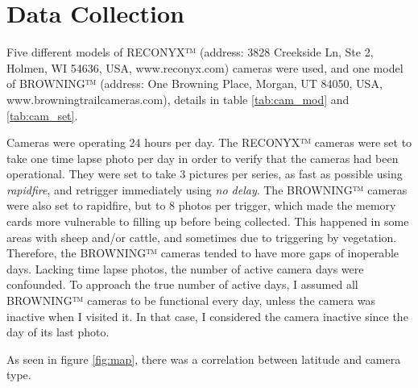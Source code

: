 



\section{Data Collection} 


Five different models of RECONYX™ (address: 3828 Creekside Ln, Ste 2, Holmen, WI 54636, USA, www.reconyx.com) cameras were used, 
and one model of BROWNING™ (address: One Browning Place, Morgan, UT 84050, USA, www.browningtrailcameras.com), details in table \ref{tab:cam_mod} and \ref{tab:cam_set}.






Cameras were operating 24 hours per day. The RECONYX™ cameras were set to take one time lapse photo per day in order to verify that the cameras had been operational.
They were set to take 3 pictures per series, as fast as possible using \emph{rapidfire}, and retrigger immediately using \emph{no delay}.
The BROWNING™ cameras were also set to rapidfire, but to 8 photos per trigger, which made the memory cards more vulnerable to filling up before being collected. This happened in some areas with sheep and/or cattle, and sometimes due to triggering by vegetation.
Therefore, the BROWNING™ cameras tended to have more gaps of inoperable days.
Lacking time lapse photos, the number of active camera days were confounded.
To approach the true number of active days, I assumed all BROWNING™ cameras to be functional every day, unless the camera was inactive when I visited it. In that case, I considered the camera inactive since the day of its last photo.



As seen in figure \ref{fig:map}, %
there was a correlation between latitude and camera type.





